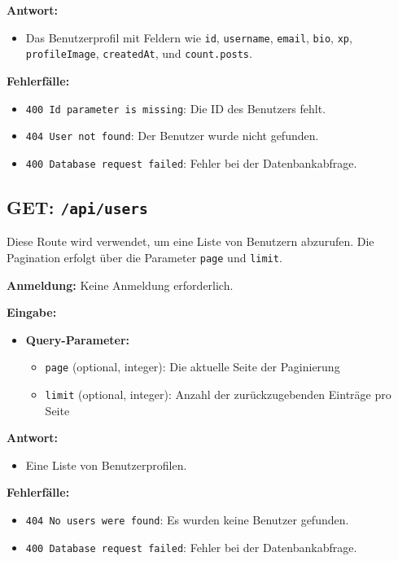 \documentclass[a4paper,12pt]{article}
\begin{document}
\textbf{Antwort:}
\begin{itemize}
    \item Das Benutzerprofil mit Feldern wie
        \texttt{id},
        \texttt{username},
        \texttt{email},
        \texttt{bio},
        \texttt{xp},
        \texttt{profileImage},
        \texttt{createdAt},
        und \texttt{count.posts}.
\end{itemize}

\textbf{Fehlerfälle:}
\begin{itemize}
    \item \texttt{400 Id parameter is missing}:
        Die ID des Benutzers fehlt.
    \item \texttt{404 User not found}:
        Der Benutzer wurde nicht gefunden.
    \item \texttt{400 Database request failed}:
        Fehler bei der Datenbankabfrage.
\end{itemize}

\subsection{GET: \texttt{/api/users}}

Diese Route wird verwendet, um eine Liste von Benutzern abzurufen. Die
Pagination erfolgt über die Parameter \texttt{page} und \texttt{limit}.

\textbf{Anmeldung:} Keine Anmeldung erforderlich.

\textbf{Eingabe:}
\begin{itemize}
    \item \textbf{Query-Parameter:}
    \begin{itemize}
        \item \texttt{page} (optional, integer):
            Die aktuelle Seite der Paginierung
        \item \texttt{limit} (optional, integer):
            Anzahl der zurückzugebenden Einträge pro Seite
    \end{itemize}
\end{itemize}

\textbf{Antwort:}
\begin{itemize}
    \item Eine Liste von Benutzerprofilen.
\end{itemize}

\textbf{Fehlerfälle:}
\begin{itemize}
    \item \texttt{404 No users were found}:
        Es wurden keine Benutzer gefunden.
    \item \texttt{400 Database request failed}:
        Fehler bei der Datenbankabfrage.
\end{itemize}
\end{document}

